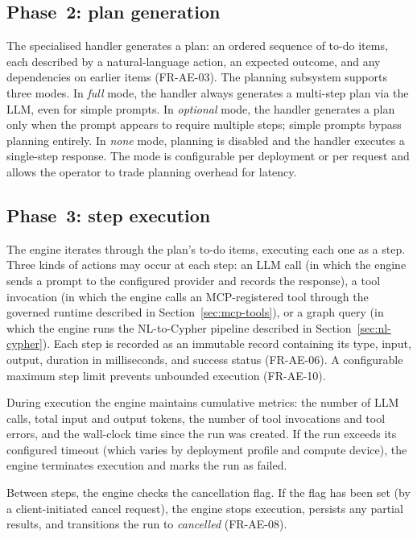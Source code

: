 \documentclass[a4paper,noexaminfo]{sapthesis}
\begin{document}
\subsection{Phase~2: plan generation}

The specialised handler generates a plan: an ordered sequence of to-do
items, each described by a natural-language action, an expected outcome,
and any dependencies on earlier items (FR-AE-03).  The planning subsystem
supports three modes.  In \emph{full} mode, the handler always generates
a multi-step plan via the LLM, even for simple prompts.  In
\emph{optional} mode, the handler generates a plan only when the prompt
appears to require multiple steps; simple prompts bypass planning
entirely.  In \emph{none} mode, planning is disabled and the handler
executes a single-step response.  The mode is configurable per deployment
or per request and allows the operator to trade planning overhead for
latency.

\subsection{Phase~3: step execution}

The engine iterates through the plan's to-do items, executing each one as
a step.  Three kinds of actions may occur at each step: an LLM call (in
which the engine sends a prompt to the configured provider and records the
response), a tool invocation (in which the engine calls an MCP-registered
tool through the governed runtime described in
Section~\ref{sec:mcp-tools}), or a graph query (in which the engine runs
the NL-to-Cypher pipeline described in Section~\ref{sec:nl-cypher}).  Each
step is recorded as an immutable record containing its type, input, output,
duration in milliseconds, and success status (FR-AE-06).  A configurable
maximum step limit prevents unbounded execution (FR-AE-10).

During execution the engine maintains cumulative metrics: the number of
LLM calls, total input and output tokens, the number of tool invocations
and tool errors, and the wall-clock time since the run was created.  If
the run exceeds its configured timeout (which varies by deployment
profile and compute device), the engine terminates execution and marks
the run as failed.

Between steps, the engine checks the cancellation flag.  If the flag has
been set (by a client-initiated cancel request), the engine stops
execution, persists any partial results, and transitions the run to
\emph{cancelled} (FR-AE-08).
\end{document}
